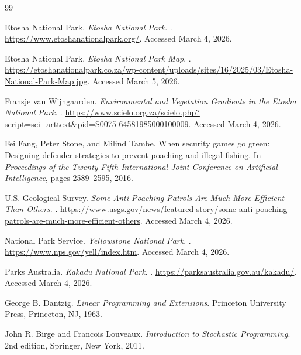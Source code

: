 ﻿\begin{thebibliography}{99}

Etosha National Park.
\newblock \emph{Etosha National Park}.
.
\newblock \url{https://www.etoshanationalpark.org/}. Accessed March 4, 2026.

Etosha National Park.
\newblock \emph{Etosha National Park Map}.
.
\newblock \url{https://etoshanationalpark.co.za/wp-content/uploads/sites/16/2025/03/Etosha-National-Park-Map.jpg}. Accessed March 5, 2026.

Fransje van Wijngaarden.
\newblock \emph{Environmental and Vegetation Gradients in the Etosha National Park}.
.
\newblock \url{https://www.scielo.org.za/scielo.php?script=sci_arttext&pid=S0075-64581985000100009}. Accessed March 4, 2026.

Fei Fang, Peter Stone, and Milind Tambe.
\newblock When security games go green: Designing defender strategies to prevent poaching and illegal fishing.
\newblock In \emph{Proceedings of the Twenty-Fifth International Joint Conference on Artificial Intelligence}, pages 2589--2595, 2016.

U.S. Geological Survey.
\newblock \emph{Some Anti-Poaching Patrols Are Much More Efficient Than Others}.
.
\newblock \url{https://www.usgs.gov/news/featured-story/some-anti-poaching-patrols-are-much-more-efficient-others}. Accessed March 4, 2026.

National Park Service.
\newblock \emph{Yellowstone National Park}.
.
\newblock \url{https://www.nps.gov/yell/index.htm}. Accessed March 4, 2026.

Parks Australia.
\newblock \emph{Kakadu National Park}.
.
\newblock \url{https://parksaustralia.gov.au/kakadu/}. Accessed March 4, 2026.

George B. Dantzig.
\newblock \emph{Linear Programming and Extensions}.
\newblock Princeton University Press, Princeton, NJ, 1963.

John R. Birge and Francois Louveaux.
\newblock \emph{Introduction to Stochastic Programming}.
\newblock 2nd edition, Springer, New York, 2011.


\end{thebibliography}
